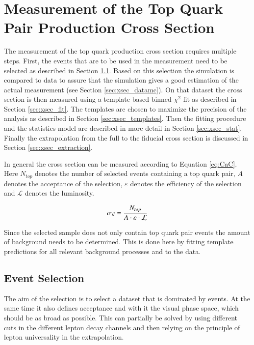 \chapter{Measurement of the Top Quark Pair Production Cross Section}

The measurement of the top quark production cross section requires multiple steps.
First, the events that are to be used in the measurement need to be selected as described in Section \ref{sec:xsec_sel}.
Based on this selection the simulation is compared to data to assure that the simulation gives a good estimation of the actual measurement (see Section \ref{sec:xsec_datamc}).
On that dataset the cross section is then measured using a template based binned $\chi^2$ fit as described in Section \ref{sec:xsec_fit}.
The templates are chosen to maximize the precision of the analysis as described in Section \ref{sec:xsec_templates}.
Then the fitting procedure and the statistics model are described in more detail in Section \ref{sec:xsec_stat}.
Finally the extrapolation from the full to the fiducial cross section is discussed in Section \ref{sec:xsec_extraction}.

In general the cross section can be measured according to Equation \ref{eq:CaC}. Here $N_{top}$ denotes the number of selected events containing a top quark pair, $A$ denotes the acceptance of the selection,
$\varepsilon$ denotes the efficiency of the selection and $\mathcal{L}$ denotes the luminosity.

\begin{equation}
\sigma_{t\bar{t}} = \frac{N_{top}}{A \cdot \varepsilon \cdot \mathcal{L}}
\label{eq:CaC}
\end{equation} 

Since the selected sample does not only contain top quark pair events the amount of background needs to be determined.
This is done here by fitting template predictions for all relevant background processes and \ttbar to the data.

\section{Event Selection}
\label{sec:xsec_sel}

The aim of the selection is to select a dataset that is dominated by \ttbar events.
At the same time it also defines acceptance and with it the visual phase space, which should be as broad as possible.
This can partially be solved by using different cuts in the different lepton decay channels and then relying on the principle
of lepton universality in the extrapolation.


